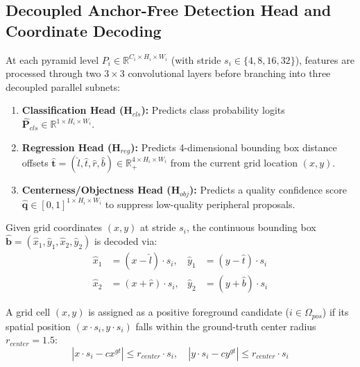 \documentclass[conference]{IEEEtran}
\begin{document}
\subsection{Decoupled Anchor-Free Detection Head and Coordinate Decoding}
At each pyramid level $P_i \in \mathbb{R}^{C_i \times H_i \times W_i}$ (with stride $s_i \in \{4, 8, 16, 32\}$), features are processed through two $3 \times 3$ convolutional layers before branching into three decoupled parallel subnets:
\begin{enumerate}
    \item \textbf{Classification Head ($\mathbf{H}_{cls}$):} Predicts class probability logits $\hat{\mathbf{P}}_{cls} \in \mathbb{R}^{1 \times H_i \times W_i}$.
    \item \textbf{Regression Head ($\mathbf{H}_{reg}$):} Predicts 4-dimensional bounding box distance offsets $\hat{\mathbf{t}} = (\hat{l}, \hat{t}, \hat{r}, \hat{b}) \in \mathbb{R}_+^{4 \times H_i \times W_i}$ from the current grid location $(x, y)$.
    \item \textbf{Centerness/Objectness Head ($\mathbf{H}_{obj}$):} Predicts a quality confidence score $\hat{\mathbf{q}} \in [0, 1]^{1 \times H_i \times W_i}$ to suppress low-quality peripheral proposals.
\end{enumerate}

Given grid coordinates $(x, y)$ at stride $s_i$, the continuous bounding box $\hat{\mathbf{b}} = (\hat{x}_1, \hat{y}_1, \hat{x}_2, \hat{y}_2)$ is decoded via:
\begin{equation}
\begin{aligned}
\hat{x}_1 &= (x - \hat{l}) \cdot s_i, & \hat{y}_1 &= (y - \hat{t}) \cdot s_i \\
\hat{x}_2 &= (x + \hat{r}) \cdot s_i, & \hat{y}_2 &= (y + \hat{b}) \cdot s_i
\end{aligned}
\end{equation}

A grid cell $(x, y)$ is assigned as a positive foreground candidate ($i \in \Omega_{pos}$) if its spatial position $(x \cdot s_i, y \cdot s_i)$ falls within the ground-truth center radius $r_{center} = 1.5$:
\begin{equation}
|x \cdot s_i - cx^{gt}| \le r_{center} \cdot s_i, \quad |y \cdot s_i - cy^{gt}| \le r_{center} \cdot s_i
\end{equation}
\end{document}
